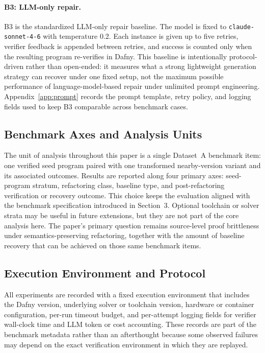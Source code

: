 \paragraph{B3: LLM-only repair.}
B3 is the standardized LLM-only repair baseline. The model is fixed to \texttt{claude-sonnet-4-6} with temperature 0.2. Each instance is given up to five retries, verifier feedback is appended between retries, and success is counted only when the resulting program re-verifies in Dafny. This baseline is intentionally protocol-driven rather than open-ended: it measures what a strong lightweight generation strategy can recover under one fixed setup, not the maximum possible performance of language-model-based repair under unlimited prompt engineering. Appendix~\ref{app:prompt} records the prompt template, retry policy, and logging fields used to keep B3 comparable across benchmark cases.

\subsection{Benchmark Axes and Analysis Units}

The unit of analysis throughout this paper is a single Dataset~A benchmark item: one verified seed program paired with one transformed nearby-version variant and its associated outcomes. Results are reported along four primary axes: seed-program stratum, refactoring class, baseline type, and post-refactoring verification or recovery outcome. This choice keeps the evaluation aligned with the benchmark specification introduced in Section~3. Optional toolchain or solver strata may be useful in future extensions, but they are not part of the core analysis here. The paper's primary question remains source-level proof brittleness under semantics-preserving refactoring, together with the amount of baseline recovery that can be achieved on those same benchmark items.

\subsection{Execution Environment and Protocol}

All experiments are recorded with a fixed execution environment that includes the Dafny version, underlying solver or toolchain version, hardware or container configuration, per-run timeout budget, and per-attempt logging fields for verifier wall-clock time and LLM token or cost accounting. These records are part of the benchmark metadata rather than an afterthought because some observed failures may depend on the exact verification environment in which they are replayed.

